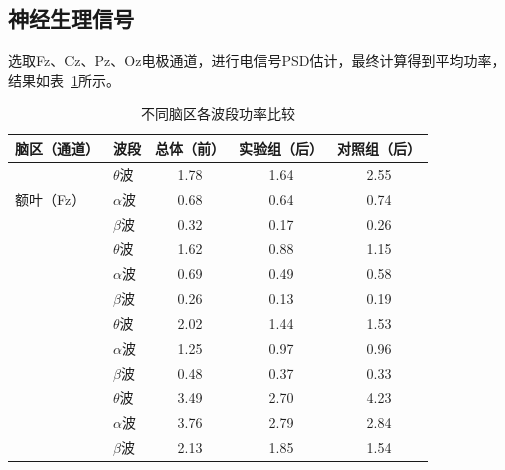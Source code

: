 \documentclass[runningheads]{llncs}
\begin{document}
\subsection{神经生理信号}
选取Fz、Cz、Pz、Oz电极通道，进行电信号PSD估计，最终计算得到平均功率，结果如表~\ref{tab:3}所示。

\begin{table}[t]
\centering
\caption{不同脑区各波段功率比较}
\label{tab:3}
\begin{tabular}{llccc}
\toprule
脑区（通道） & 波段 & 总体（前） & 实验组（后） & 对照组（后） \\
\midrule
\multirow{3}{*}{额叶（Fz）} & $\theta$波 & 1.78 & 1.64 & 2.55 \\
 & $\alpha$波 & 0.68 & 0.64 & 0.74 \\
 & $\beta$波 & 0.32 & 0.17 & 0.26 \\
\addlinespace
\multirow{3}{*}{额叶中心沟（Cz）} & $\theta$波 & 1.62 & 0.88 & 1.15 \\
 & $\alpha$波 & 0.69 & 0.49 & 0.58 \\
 & $\beta$波 & 0.26 & 0.13 & 0.19 \\
\addlinespace
\multirow{3}{*}{顶叶（Pz）} & $\theta$波 & 2.02 & 1.44 & 1.53 \\
 & $\alpha$波 & 1.25 & 0.97 & 0.96 \\
 & $\beta$波 & 0.48 & 0.37 & 0.33 \\
\addlinespace
\multirow{3}{*}{枕叶（Oz）} & $\theta$波 & 3.49 & 2.70 & 4.23 \\
 & $\alpha$波 & 3.76 & 2.79 & 2.84 \\
 & $\beta$波 & 2.13 & 1.85 & 1.54 \\
\bottomrule
\end{tabular}
\end{table}
\end{document}
